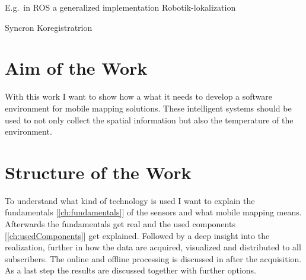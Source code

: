 E.g.\ in \ac{ROS} a generalized implementation 
Robotik-lokalization\cite{MooreStouchKeneralizedEkf2014}

Syncron Koregistratrion\cite{Frank2019SyncKoreg} 

\section{Aim of the Work}\label{sec:aimOfTheWork}
With this work I want to show how a what it needs to develop a software environment for mobile mapping solutions.
These intelligent systems should be used to not only collect the spatial information but also the temperature of the environment.

\section{Structure of the Work}\label{sec:structure}

To understand what kind of technology is used I want to explain the fundamentals [\ref{ch:fundamentals}] of the sensors and what mobile mapping means.
Afterwards the fundamentals get real and the used components [\ref{ch:usedComponents}] get explained.
Followed by a deep insight into the realization, further in how the data are acquired, visualized and distributed to all subscribers.
The online and offline processing is discussed in after the acquisition.
As a last step the results are discussed together with further options.

